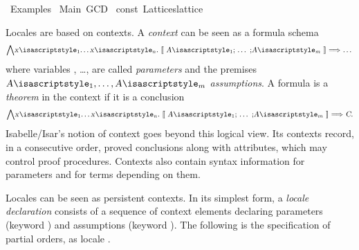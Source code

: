 %
\begin{isabellebody}%
\def\isabellecontext{Examples}%
%
\isadelimtheory
\isanewline
\isanewline
%
\endisadelimtheory
%
\isatagtheory
{}\isamarkupfalse%
\ Examples\isanewline
{}\ Main\ GCD\isanewline
{}%
\endisatagtheory
{\isafoldtheory}%
%
\isadelimtheory
\isanewline
%
\endisadelimtheory
%
\isadeliminvisible
\isanewline
%
\endisadeliminvisible
%
\isataginvisible
{}\isamarkupfalse%
\ const\ Lattices{\isachardot}lattice\isanewline
{}\isamarkupfalse%
\ {}{}%
\endisataginvisible
{\isafoldinvisible}%
%
\isadeliminvisible
%
\endisadeliminvisible
%
\isamarkuptrue%
%
\begin{isamarkuptext}%
Locales are based on contexts.  A \emph{context} can be seen as a
  formula schema
\[
  \isa{{\isasymAnd}x\isactrlsub {\isadigit{1}}{\isasymdots}x\isactrlsub n{\isachardot}\ {\isasymlbrakk}\ A\isactrlsub {\isadigit{1}}{\isacharsemicolon}\ {\isasymdots}\ {\isacharsemicolon}A\isactrlsub m\ {\isasymrbrakk}\ {\isasymLongrightarrow}\ {\isasymdots}}
\]
  where variables , \ldots,  are called
  \emph{parameters} and the premises $\isa{A\isactrlsub {\isadigit{1}}}, \ldots,
  \isa{A\isactrlsub m}$ \emph{assumptions}.  A formula 
  is a \emph{theorem} in the context if it is a conclusion
\[
  \isa{{\isasymAnd}x\isactrlsub {\isadigit{1}}{\isasymdots}x\isactrlsub n{\isachardot}\ {\isasymlbrakk}\ A\isactrlsub {\isadigit{1}}{\isacharsemicolon}\ {\isasymdots}\ {\isacharsemicolon}A\isactrlsub m\ {\isasymrbrakk}\ {\isasymLongrightarrow}\ C}.
\]
  Isabelle/Isar's notion of context goes beyond this logical view.
  Its contexts record, in a consecutive order, proved
  conclusions along with attributes, which
  may control proof procedures.  Contexts also contain syntax information
  for parameters and for terms depending on them.%
\end{isamarkuptext}%
\isamarkuptrue%
%
\isamarkuptrue%
%
\begin{isamarkuptext}%
Locales can be seen as persistent contexts.  In its simplest form, a
  \emph{locale declaration} consists of a sequence of context elements
  declaring parameters (keyword ) and assumptions
  (keyword ).  The following is the specification of
  partial orders, as locale .%

\end{isamarkuptext}
\end{isabellebody}
